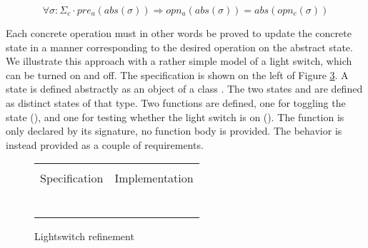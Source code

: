 \begin{equation} \label{eq:refinement}
\forall \sigma : \Sigma_c \cdot 
  pre_a(abs(\sigma)) \Rightarrow opn_a(abs(\sigma)) = abs(opn_c(\sigma))
\end{equation}

\noindent
Each concrete operation must in other words be proved to update the concrete state
in a manner corresponding to the desired operation on the abstract state.
We illustrate this approach with a rather simple \Klang{} model of a light switch,
which can be turned on and off.  The specification is shown on the left of
Figure \ref{fig:lightswitch}. A state is defined abstractly as an object of 
a class . The two states  and  are defined as 
distinct states of that type. Two functions are defined, one for toggling
the state (), and one for testing whether the light switch is on
(). The  function is only declared by its signature, no 
function body is provided. The behavior is instead provided  as a couple of
requirements.

\begin{figure}
  \centering
  \begin{tabular}[c]{c|c}
    \hline \\
    Specification & Implementation \\
    \hline\hline \\ \\
    \begin{subfigure}[c]{0.5\textwidth}
     
      \label{fig:lightswitch1}
    \end{subfigure}
    &
    \begin{subfigure}[c]{0.5\textwidth}
      
      \label{fig:lightswicth2}
    \end{subfigure}
    \\ \\
    \hline
  \end{tabular}    
  \caption{Lightswitch refinement}
  \label{fig:lightswitch}
\end{figure}

